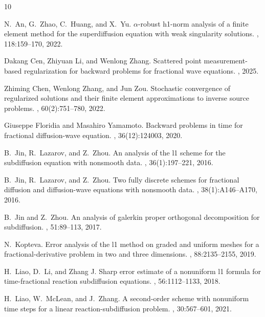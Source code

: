 \documentclass[11pt]{article}
\numberwithin{equation}{section}
\begin{document}
\begin{thebibliography}{10}

N.~An, G.~Zhao, C.~Huang, and X.~Yu.
\newblock $\alpha$-robust h1-norm analysis of a finite element method for the
  superdiffusion equation with weak singularity solutions.
, 118:159--170, 2022.

Dakang Cen, Zhiyuan Li, and Wenlong Zhang.
\newblock Scattered point measurement-based regularization for backward
  problems for fractional wave equations.
, 2025.

Zhiming Chen, Wenlong Zhang, and Jun Zou.
\newblock Stochastic convergence of regularized solutions and their finite
  element approximations to inverse source problems.
, 60(2):751--780, 2022.

Giuseppe Floridia and Masahiro Yamamoto.
\newblock Backward problems in time for fractional diffusion-wave equation.
, 36(12):124003, 2020.

B.~Jin, R.~Lazarov, and Z.~Zhou.
\newblock An analysis of the l1 scheme for the subdiffusion equation with
  nonsmooth data.
, 36(1):197--221, 2016.

B.~Jin, R.~Lazarov, and Z.~Zhou.
\newblock Two fully discrete schemes for fractional diffusion and
  diffusion-wave equations with nonsmooth data.
, 38(1):A146--A170, 2016.

B.~Jin and Z.~Zhou.
\newblock An analysis of galerkin proper orthogonal decomposition for
  subdiffusion.
,
  51:89--113, 2017.

N.~Kopteva.
\newblock Error analysis of the l1 method on graded and uniform meshes for a
  fractional-derivative problem in two and three dimensions.
, 88:2135--2155, 2019.

H.~Liao, D.~Li, and Zhang J.
\newblock Sharp error estimate of a nonuniform l1 formula for time-fractional
  reaction subdiffusion equations.
, 56:1112--1133, 2018.

H.~Liao, W.~McLean, and J.~Zhang.
\newblock A second-order scheme with nonuniform time steps for a linear
  reaction-subdiffusion problem.
, 30:567--601, 2021.


\end{thebibliography}
\end{document}
